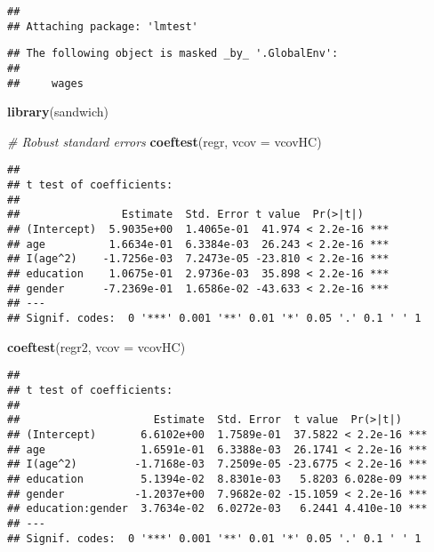 \documentclass[]{article}
\newenvironment{Shaded}{\begin{snugshade}}{\end{snugshade}}
\newcommand{\KeywordTok}[1]{\textcolor[rgb]{0.13,0.29,0.53}{\textbf{#1}}}
\newcommand{\DataTypeTok}[1]{\textcolor[rgb]{0.13,0.29,0.53}{#1}}
\newcommand{\CommentTok}[1]{\textcolor[rgb]{0.56,0.35,0.01}{\textit{#1}}}
\newcommand{\NormalTok}[1]{#1}
\begin{document}
\begin{verbatim}
## 
## Attaching package: 'lmtest'
\end{verbatim}

\begin{verbatim}
## The following object is masked _by_ '.GlobalEnv':
## 
##     wages
\end{verbatim}

\begin{Shaded}
\begin{Highlighting}[]
\KeywordTok{library}\NormalTok{(sandwich)}
\end{Highlighting}
\end{Shaded}

\begin{Shaded}
\begin{Highlighting}[]
\CommentTok{# Robust standard errors}
\KeywordTok{coeftest}\NormalTok{(regr, }\DataTypeTok{vcov =}\NormalTok{ vcovHC)}
\end{Highlighting}
\end{Shaded}

\begin{verbatim}
## 
## t test of coefficients:
## 
##                Estimate  Std. Error t value  Pr(>|t|)    
## (Intercept)  5.9035e+00  1.4065e-01  41.974 < 2.2e-16 ***
## age          1.6634e-01  6.3384e-03  26.243 < 2.2e-16 ***
## I(age^2)    -1.7256e-03  7.2473e-05 -23.810 < 2.2e-16 ***
## education    1.0675e-01  2.9736e-03  35.898 < 2.2e-16 ***
## gender      -7.2369e-01  1.6586e-02 -43.633 < 2.2e-16 ***
## ---
## Signif. codes:  0 '***' 0.001 '**' 0.01 '*' 0.05 '.' 0.1 ' ' 1
\end{verbatim}

\begin{Shaded}
\begin{Highlighting}[]
\KeywordTok{coeftest}\NormalTok{(regr2, }\DataTypeTok{vcov =}\NormalTok{ vcovHC)}
\end{Highlighting}
\end{Shaded}

\begin{verbatim}
## 
## t test of coefficients:
## 
##                     Estimate  Std. Error  t value  Pr(>|t|)    
## (Intercept)       6.6102e+00  1.7589e-01  37.5822 < 2.2e-16 ***
## age               1.6591e-01  6.3388e-03  26.1741 < 2.2e-16 ***
## I(age^2)         -1.7168e-03  7.2509e-05 -23.6775 < 2.2e-16 ***
## education         5.1394e-02  8.8301e-03   5.8203 6.028e-09 ***
## gender           -1.2037e+00  7.9682e-02 -15.1059 < 2.2e-16 ***
## education:gender  3.7634e-02  6.0272e-03   6.2441 4.410e-10 ***
## ---
## Signif. codes:  0 '***' 0.001 '**' 0.01 '*' 0.05 '.' 0.1 ' ' 1
\end{verbatim}
\end{document}
